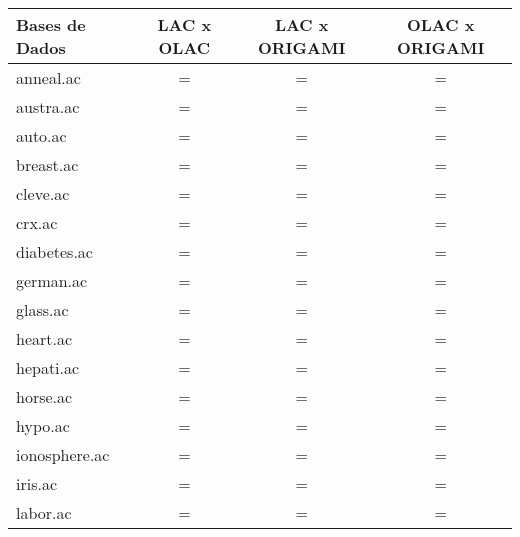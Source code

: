 \begin{table}[htbp]
	\centering
		\renewcommand{\tabcolsep}{1.8mm}
		\begin{tabular}{|l|c|c|c|}
		\hline
		\textbf{Bases de Dados}	& \textbf{LAC x OLAC}	& \textbf{LAC x ORIGAMI}	& \textbf{OLAC x ORIGAMI}	\\
		\hline
		anneal.ac               & =                     & =                     & =                     \\
		\hline
		austra.ac               & =                     & =                     & =                     \\
		\hline
		auto.ac                 & =                     & =                     & =                     \\
		\hline
		breast.ac               & =                     & =                     & =                     \\
		\hline
		cleve.ac                & =                     & =                     & =                     \\
		\hline
		crx.ac                  & =                     & =                     & =                     \\
		\hline
		diabetes.ac             & =                     & =                     & =                     \\
		\hline
		german.ac               & =                     & =                     & =                     \\
		\hline
		glass.ac                & =                     & =                     & =                     \\
		\hline
		heart.ac                & =                     & =                     & =                     \\
		\hline
		hepati.ac               & =                     & =                     & =                     \\
		\hline
		horse.ac                & =                     & =                     & =                     \\
		\hline
		hypo.ac                 & =                     & =                     & =                     \\
		\hline
		ionosphere.ac           & =                     & =                     & =                     \\
		\hline
		iris.ac                 & =                     & =                     & =                     \\
		\hline
		labor.ac                & =                     & =                     & =                     \\

\end{tabular}
\end{table}
